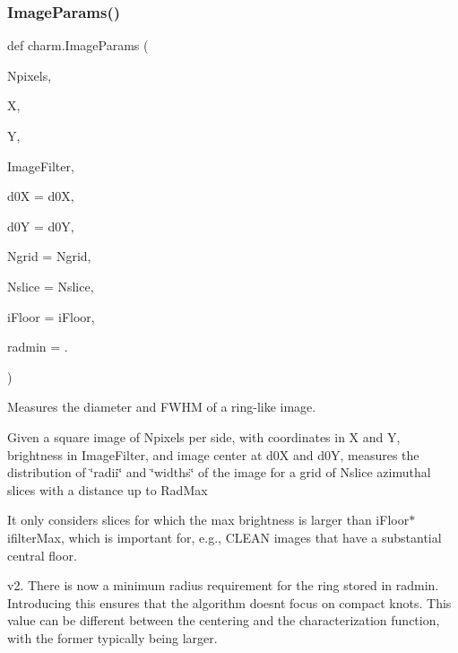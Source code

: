 \subsubsection{\texorpdfstring{ImageParams()}{ImageParams()}}
{\footnotesize\ttfamily def charm.\+Image\+Params (\begin{DoxyParamCaption}\item[{}]{Npixels,  }\item[{}]{X,  }\item[{}]{Y,  }\item[{}]{Image\+Filter,  }\item[{}]{d0X = {\ttfamily d0X},  }\item[{}]{d0Y = {\ttfamily d0Y},  }\item[{}]{Ngrid = {\ttfamily Ngrid},  }\item[{}]{Nslice = {\ttfamily Nslice},  }\item[{}]{i\+Floor = {\ttfamily iFloor},  }\item[{}]{radmin = {.} }\end{DoxyParamCaption})}



Measures the diameter and F\+W\+HM of a ring-\/like image. 

Given a square image of Npixels per side, with coordinates in X and Y, brightness in Image\+Filter, and image center at d0X and d0Y, measures the distribution of \char`\"{}radii\char`\"{} and \char`\"{}widths\char`\"{} of the image for a grid of Nslice azimuthal slices with a distance up to Rad\+Max

It only considers slices for which the max brightness is larger than i\+Floor$\ast$ifilter\+Max, which is important for, e.\+g., C\+L\+E\+AN images that have a substantial central floor.

v2. There is now a minimum radius requirement for the ring stored in \textquotesingle{}radmin\textquotesingle{}. Introducing this ensures that the algorithm doesn\textquotesingle{}t focus on compact knots. This value can be different between the centering and the characterization function, with the former typically being larger.


